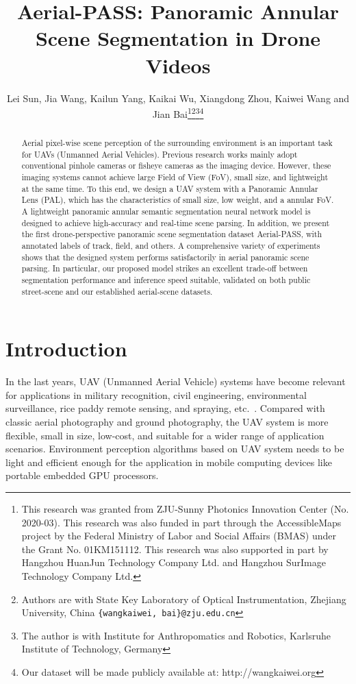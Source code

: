 \documentclass[letterpaper, 10 pt, conference]{ieeeconf}
\title{\LARGE \bf
Aerial-PASS: Panoramic Annular Scene Segmentation in Drone Videos
}
\author{Lei Sun, Jia Wang, Kailun Yang, Kaikai Wu, Xiangdong Zhou, Kaiwei Wang and Jian Bai\thanks{This research was granted from ZJU-Sunny Photonics Innovation Center (No. 2020-03). This research was also funded in part through the AccessibleMaps project by the Federal Ministry of Labor and Social Affairs (BMAS) under the Grant No. 01KM151112. This research was also supported in part by Hangzhou HuanJun Technology Company Ltd. and Hangzhou SurImage Technology Company Ltd.}\thanks{Authors are with State Key Laboratory of Optical Instrumentation, Zhejiang University, China {\tt \{wangkaiwei, bai\}@zju.edu.cn}}\thanks{The author is with Institute for Anthropomatics and Robotics, Karlsruhe Institute of Technology, Germany}\thanks{Our dataset will be made publicly available at: http://wangkaiwei.org}
}
\begin{document}
\maketitle
\thispagestyle{empty}
\pagestyle{empty}


\begin{abstract}

Aerial pixel-wise scene perception of the surrounding environment is an important task for UAVs (Unmanned Aerial Vehicles).
Previous research works mainly adopt conventional pinhole cameras or fisheye cameras as the imaging device. However, these imaging systems cannot achieve large Field of View (FoV), small size, and lightweight at the same time.
To this end, we design a UAV system with a Panoramic Annular Lens (PAL), which has the characteristics of small size, low weight, and a  annular FoV.
A lightweight panoramic annular semantic segmentation neural network model is designed to achieve high-accuracy and real-time scene parsing.
In addition, we present the first drone-perspective panoramic scene segmentation dataset Aerial-PASS, with annotated labels of track, field, and others.
A comprehensive variety of experiments shows that the designed system performs satisfactorily in aerial panoramic scene parsing.
In particular, our proposed model strikes an excellent trade-off between segmentation performance and inference speed suitable, validated on both public street-scene and our established aerial-scene datasets.

\end{abstract}


\section{Introduction}

In the last years, UAV (Unmanned Aerial Vehicle) systems have become relevant for applications in military recognition, civil engineering, environmental surveillance, rice paddy remote sensing, and spraying, etc.~\cite{adams2011survey,d2012unmanned}.
Compared with classic aerial photography and ground photography, the UAV system is more flexible, small in size, low-cost, and suitable for a wider range of application scenarios. Environment perception algorithms based on UAV system needs to be light and efficient enough for the application in mobile computing devices like portable embedded GPU processors.
\end{document}
